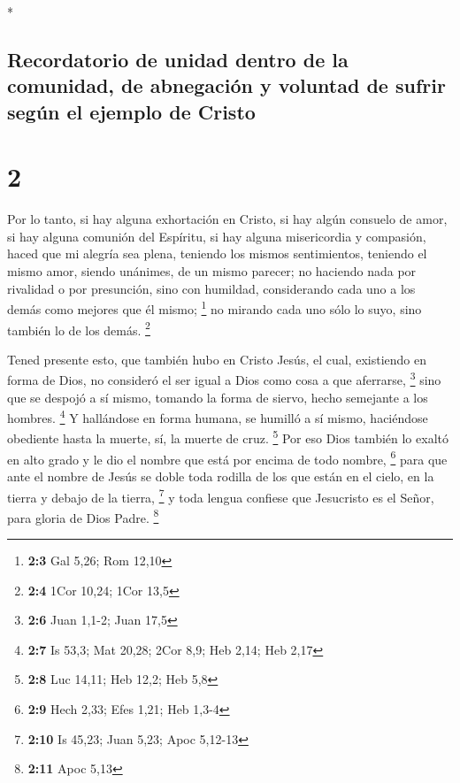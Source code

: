 \begin{paracol}{2}
\begin{otherlanguage}{english}
\end{otherlanguage}

\switchcolumn[0]*

\hypertarget{recordatorio-de-unidad-dentro-de-la-comunidad-de-abnegaciuxf3n-y-voluntad-de-sufrir-seguxfan-el-ejemplo-de-cristo}{%
\subsection{Recordatorio de unidad dentro de la comunidad, de abnegación
y voluntad de sufrir según el ejemplo de
Cristo}\label{recordatorio-de-unidad-dentro-de-la-comunidad-de-abnegaciuxf3n-y-voluntad-de-sufrir-seguxfan-el-ejemplo-de-cristo}}

\hypertarget{section-2}{%
\section{2}\label{section-2}}

 Por lo tanto, si hay alguna exhortación en Cristo, si hay
algún consuelo de amor, si hay alguna comunión del Espíritu, si hay
alguna misericordia y compasión,  haced que mi alegría sea
plena, teniendo los mismos sentimientos, teniendo el mismo amor, siendo
unánimes, de un mismo parecer;  no haciendo nada por
rivalidad o por presunción, sino con humildad, considerando cada uno a
los demás como mejores que él mismo; \footnote{\textbf{2:3} Gal 5,26;
  Rom 12,10}  no mirando cada uno sólo lo suyo, sino
también lo de los demás. \footnote{\textbf{2:4} 1Cor 10,24; 1Cor 13,5}

 Tened presente esto, que también hubo en Cristo Jesús,
 el cual, existiendo en forma de Dios, no consideró el ser
igual a Dios como cosa a que aferrarse, \footnote{\textbf{2:6} Juan
  1,1-2; Juan 17,5}  sino que se despojó a sí mismo,
tomando la forma de siervo, hecho semejante a los hombres. \footnote{\textbf{2:7}
  Is 53,3; Mat 20,28; 2Cor 8,9; Heb 2,14; Heb 2,17}  Y
hallándose en forma humana, se humilló a sí mismo, haciéndose obediente
hasta la muerte, sí, la muerte de cruz. \footnote{\textbf{2:8} Luc
  14,11; Heb 12,2; Heb 5,8}  Por eso Dios también lo
exaltó en alto grado y le dio el nombre que está por encima de todo
nombre, \footnote{\textbf{2:9} Hech 2,33; Efes 1,21; Heb 1,3-4}
 para que ante el nombre de Jesús se doble toda rodilla
de los que están en el cielo, en la tierra y debajo de la tierra,
\footnote{\textbf{2:10} Is 45,23; Juan 5,23; Apoc 5,12-13}
 y toda lengua confiese que Jesucristo es el Señor, para
gloria de Dios Padre. \footnote{\textbf{2:11} Apoc 5,13}


\end{paracol}
